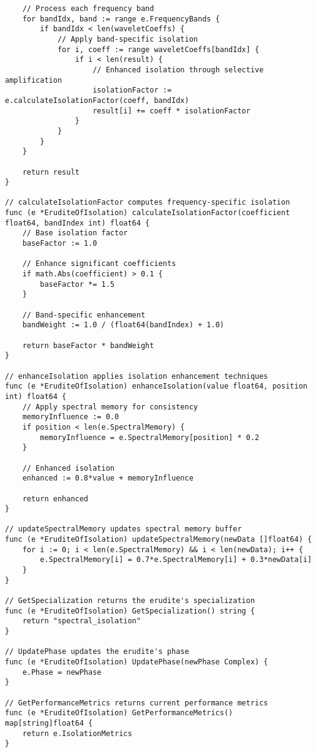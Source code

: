 \begin{tcolorbox}[colback=CodeBackground, colframe=DarkGray, title=Erudite of Isolation Implementation, fonttitle=\bfseries]
\begin{verbatim}
    // Process each frequency band
    for bandIdx, band := range e.FrequencyBands {
        if bandIdx < len(waveletCoeffs) {
            // Apply band-specific isolation
            for i, coeff := range waveletCoeffs[bandIdx] {
                if i < len(result) {
                    // Enhanced isolation through selective amplification
                    isolationFactor := e.calculateIsolationFactor(coeff, bandIdx)
                    result[i] += coeff * isolationFactor
                }
            }
        }
    }
    
    return result
}

// calculateIsolationFactor computes frequency-specific isolation
func (e *EruditeOfIsolation) calculateIsolationFactor(coefficient float64, bandIndex int) float64 {
    // Base isolation factor
    baseFactor := 1.0
    
    // Enhance significant coefficients
    if math.Abs(coefficient) > 0.1 {
        baseFactor *= 1.5
    }
    
    // Band-specific enhancement
    bandWeight := 1.0 / (float64(bandIndex) + 1.0)
    
    return baseFactor * bandWeight
}

// enhanceIsolation applies isolation enhancement techniques
func (e *EruditeOfIsolation) enhanceIsolation(value float64, position int) float64 {
    // Apply spectral memory for consistency
    memoryInfluence := 0.0
    if position < len(e.SpectralMemory) {
        memoryInfluence = e.SpectralMemory[position] * 0.2
    }
    
    // Enhanced isolation
    enhanced := 0.8*value + memoryInfluence
    
    return enhanced
}

// updateSpectralMemory updates spectral memory buffer
func (e *EruditeOfIsolation) updateSpectralMemory(newData []float64) {
    for i := 0; i < len(e.SpectralMemory) && i < len(newData); i++ {
        e.SpectralMemory[i] = 0.7*e.SpectralMemory[i] + 0.3*newData[i]
    }
}

// GetSpecialization returns the erudite's specialization
func (e *EruditeOfIsolation) GetSpecialization() string {
    return "spectral_isolation"
}

// UpdatePhase updates the erudite's phase
func (e *EruditeOfIsolation) UpdatePhase(newPhase Complex) {
    e.Phase = newPhase
}

// GetPerformanceMetrics returns current performance metrics
func (e *EruditeOfIsolation) GetPerformanceMetrics() map[string]float64 {
    return e.IsolationMetrics
}
\end{verbatim}
\end{tcolorbox}

